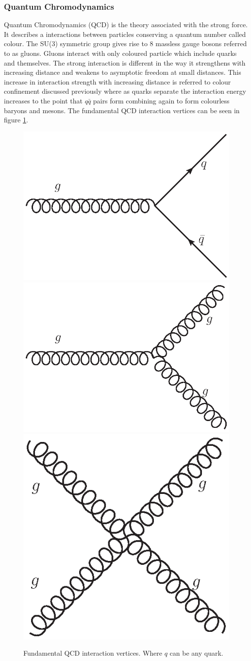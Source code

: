     \subsubsection*{Quantum Chromodynamics}
    
    Quantum Chromodynamics (QCD) is the theory associated with the strong force. It describes a interactions between particles conserving a quantum number called colour. The SU(3) symmetric group gives rise to 8 massless gauge bosons referred to as gluons. Gluons interact with only coloured particle which include quarks and themselves. The strong interaction is different in the way it strengthens with increasing distance and weakens to asymptotic freedom at small distances. This increase in interaction strength with increasing distance is referred to colour confinement discussed previously where as quarks separate the interaction energy increases to the point that $q\bar{q}$ pairs form combining again to form colourless baryons and mesons. The fundamental QCD interaction vertices can be seen in figure \ref{fig:QCD}.

    \begin{figure}[h]
        \begin{center}
        \includegraphics[width=0.3\linewidth]{images/g_quark.eps}
        \includegraphics[width=0.3\linewidth]{images/g_gg.eps}
        \includegraphics[width=0.24\linewidth]{images/gg_gg.eps}
        \end{center}
        \caption{Fundamental QCD interaction vertices. Where $q$ can be any quark.}
        \label{fig:QCD}
    \end{figure}

